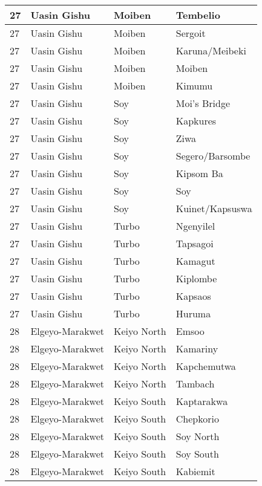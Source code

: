 \begin{table}[!ht]
\begin{tabular}{|l|l|l|l|}
        27 & Uasin Gishu & Moiben & Tembelio \\ \hline
        27 & Uasin Gishu & Moiben & Sergoit \\ \hline
        27 & Uasin Gishu & Moiben & Karuna/Meibeki \\ \hline
        27 & Uasin Gishu & Moiben & Moiben \\ \hline
        27 & Uasin Gishu & Moiben & Kimumu \\ \hline
        27 & Uasin Gishu & Soy &   Moi’s Bridge \\ \hline
        27 & Uasin Gishu & Soy & Kapkures \\ \hline
        27 & Uasin Gishu & Soy & Ziwa \\ \hline
        27 & Uasin Gishu & Soy & Segero/Barsombe \\ \hline
        27 & Uasin Gishu & Soy & Kipsom Ba \\ \hline
        27 & Uasin Gishu & Soy & Soy \\ \hline
        27 & Uasin Gishu & Soy & Kuinet/Kapsuswa \\ \hline
        27 & Uasin Gishu & Turbo &   Ngenyilel \\ \hline
        27 & Uasin Gishu & Turbo & Tapsagoi \\ \hline
        27 & Uasin Gishu & Turbo & Kamagut \\ \hline
        27 & Uasin Gishu & Turbo & Kiplombe \\ \hline
        27 & Uasin Gishu & Turbo & Kapsaos \\ \hline
        27 & Uasin Gishu & Turbo & Huruma \\ \hline
        28 & Elgeyo-Marakwet & Keiyo North & Emsoo \\ \hline
        28 & Elgeyo-Marakwet & Keiyo North & Kamariny \\ \hline
        28 & Elgeyo-Marakwet & Keiyo North & Kapchemutwa \\ \hline
        28 & Elgeyo-Marakwet & Keiyo North & Tambach \\ \hline
        28 & Elgeyo-Marakwet & Keiyo South & Kaptarakwa \\ \hline
        28 & Elgeyo-Marakwet & Keiyo South & Chepkorio \\ \hline
        28 & Elgeyo-Marakwet & Keiyo South & Soy North \\ \hline
        28 & Elgeyo-Marakwet & Keiyo South & Soy South \\ \hline
        28 & Elgeyo-Marakwet & Keiyo South & Kabiemit \\ \hline

\end{tabular}
\end{table}
